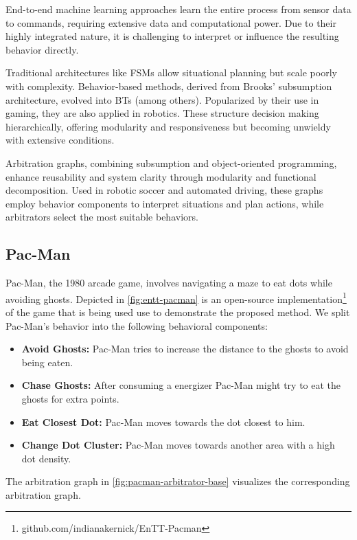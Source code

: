 End-to-end machine learning approaches learn the entire process from sensor data to commands, requiring extensive data and computational power.
Due to their highly integrated nature, it is challenging to interpret or influence the resulting behavior directly.

Traditional architectures like \glspl{FSM} allow situational planning but scale poorly with complexity. Behavior-based methods, derived from Brooks' subsumption architecture, evolved into \glspl{BT} (among others). Popularized by their use in gaming, they are also applied in robotics. These structure decision making hierarchically, offering modularity and responsiveness but becoming unwieldy with extensive conditions.

Arbitration graphs, combining subsumption and object-oriented programming, enhance reusability and system clarity through modularity and functional decomposition. Used in robotic soccer and automated driving, these graphs employ behavior components to interpret situations and plan actions, while arbitrators select the most suitable behaviors.

\subsection{Pac-Man}
Pac-Man, the 1980 arcade game, involves navigating a maze to eat dots while avoiding ghosts.
Depicted in \cref{fig:entt-pacman} is an open-source implementation\footnote{github.com/indianakernick/EnTT-Pacman}  of the game that is being used use to demonstrate the proposed method.
We split Pac-Man's behavior into the following behavioral components:

\begin{itemize}
    \item \textbf{Avoid Ghosts:} Pac-Man tries to increase the distance to the ghosts to avoid being eaten.
    \item \textbf{Chase Ghosts:} After consuming a energizer Pac-Man might try to eat the ghosts for extra points.
    \item \textbf{Eat Closest Dot:} Pac-Man moves towards the dot closest to him.
    \item \textbf{Change Dot Cluster:} Pac-Man moves towards another area with a high dot density.
\end{itemize}

The arbitration graph in \cref{fig:pacman-arbitrator-base} visualizes the corresponding arbitration graph.

